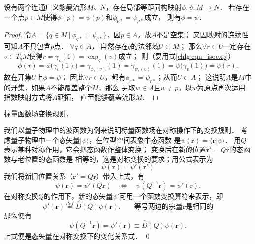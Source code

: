 \begin{proposition}\label{chlg:thm_isopall}
    设有两个连通广义黎曼流形$M$、$N$，存在局部等距同构映射$\phi,\psi:M\to N$．
    若存在一个点$p\in M$使得$\phi(p)=\psi(p)$和$\phi_{p*} = \psi_{p*}$成立，
    则有$\phi=\psi$．
\end{proposition}
\begin{proof}
    令$A=\{ q\in M \ | \  \phi_{q*} = \psi_{q*}\}$．因$p\in A$，故$A$不是空集；
    又因映射的连续性可知$A$不只包含$p$点．    $\forall q\in A$，
    自然存在$q$的法邻域$U\subset M$；
    那么$\forall r\in U$一定存在$v\in T_q M$使得$r=\gamma_v(1)=\exp_q(v)$成立；
    则（要用式\eqref{chlg:eqn_isoexp}）
    \begin{equation}
        \phi(r) = \phi \bigl(\gamma_v(1)\bigr)= \gamma_{\phi_*(v)} (1)
        = \gamma_{\psi_*(v)} (1) =\psi \bigl(\gamma_v(1)\bigr) =\psi(r).
    \end{equation}
    故在开集$U$上$\phi=\psi$；
    因此$\forall r\in U$，都有$\phi_{r*} = \psi_{r*}$；从而$U\subset A$；
    这说明$A$是$M$中的开集．如果$A$不能覆盖整个$M$，那么
    另取$w\in A$且$w\neq p$，以$w$为原点再次运用指数映射方式将$A$延拓，
    直至能够覆盖流形$M$．
\end{proof}

\begin{example}\label{chlg:exam_DQpsi}
    标量函数场变换规则．
\end{example}      
我们以量子物理中的波函数为例来说明标量函数场在对称操作下的变换规则．
考虑量子物理中一个态矢量$|\psi\rangle$，在位型空间表象中态函数
是$\psi(\boldsymbol{r}) = \langle \boldsymbol{r}|\psi\rangle$．
用$Q$表示某种对称作用，它会把态函数作整体变换；
变换后在新的位置$\boldsymbol{r}'=Q \boldsymbol{r}$的态函数与老位置的态函数是
相等的，这是对称变换的要求；用公式表示为
\begin{equation}
    \psi(\boldsymbol{r}) = \psi'(\boldsymbol{r}')
\end{equation}
我们将新旧位置关系（$\boldsymbol{r}'=Q \boldsymbol{r}$）带入上式，有
\begin{equation}
    \psi(\boldsymbol{r}) = \psi'(Q \boldsymbol{r}) \quad \Leftrightarrow \quad
    \psi(Q^{-1}\boldsymbol{r}) = \psi'(\boldsymbol{r}) .
\end{equation}
在对称变换$Q$的作用下，新的态矢量$\psi'$可用一个函数变换算符来表示，即
\begin{equation}\label{chlg:eqn_psip2psi}
    \psi'(\boldsymbol{r}) \overset{def}{=}\hat{D}(Q)\psi(\boldsymbol{r}).
    \qquad \text{等号两边的宗量$\boldsymbol{r}$是相同的}
\end{equation}
那么便有
\begin{equation}\label{chlg:eqn_DQpsi}
    \psi(Q^{-1}\boldsymbol{r})  = \psi'(\boldsymbol{r}) \equiv \hat{D}(Q)\psi(\boldsymbol{r}) .
\end{equation}
上式便是态矢量在对称变换下的变化关系式．    \qed


